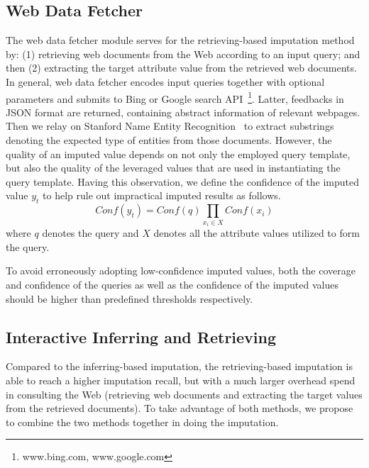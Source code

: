 \documentclass[sigconf]{acmart}
\begin{document}
\subsection{Web Data Fetcher}
The web data fetcher module serves for the retrieving-based imputation method by: (1) retrieving web documents from the Web according to an input query; and then (2) extracting the target attribute value from the retrieved web documents.
%
In general, web data fetcher encodes input queries together with optional parameters and submits to Bing or Google search API~\footnote{www.bing.com, www.google.com}. Latter, feedbacks in JSON format are returned, containing abstract information of relevant webpages. Then we relay on Stanford Name Entity Recognition~\cite{mikheev1999named} to extract substrings denoting the expected type of entities from those documents.
%
However, the quality of an imputed value depends on not only the employed query template, but also the quality of the leveraged values that are used in instantiating the query template. Having this observation, we define the confidence of the imputed value $y_t$ to help rule out impractical imputed results as follows.
\begin{equation}
Conf(y_t)=Conf(q)\prod_{x_i \in X}Conf(x_i)
\end{equation}
where $q$ denotes the query and $X$ denotes all the  attribute values utilized to form the query.

To avoid erroneously adopting low-confidence imputed values, both the coverage and confidence of the queries as well as the confidence of the imputed values should be higher than predefined thresholds respectively.

\vspace{-5pt}
\subsection{Interactive Inferring and Retrieving}
Compared to the inferring-based imputation, the retrieving-based imputation is able to reach a higher imputation recall, but with a much larger overhead spend in consulting the Web (retrieving web documents and extracting the target values from the retrieved documents).
%
To take advantage of both methods, we propose to combine the two methods together in doing the imputation.
\end{document}
